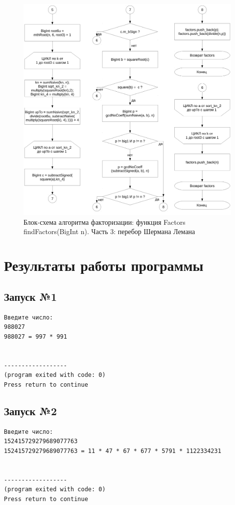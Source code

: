 \documentclass[a4paper,12pt]{article} %
\begin{document}
\begin{figure}[ht]
	\centering
	\includegraphics[width=\textwidth]{lr7_findFactors-3.pdf}
	\caption{
		Блок-схема алгоритма факторизации: функция Factors findFactors(BigInt n).
		Часть 3: перебор Шермана Лемана
	}
\end{figure}

\clearpage

\section*{Результаты работы программы}




\subsection*{Запуск №1}
\begin{verbatim}
Введите число:
988027
988027 = 997 * 991


------------------
(program exited with code: 0)
Press return to continue
\end{verbatim}

\subsection*{Запуск №2}
\begin{verbatim}
Введите число:
152415729279689077763
152415729279689077763 = 11 * 47 * 67 * 677 * 5791 * 1122334231


------------------
(program exited with code: 0)
Press return to continue
\end{verbatim}
\end{document}
